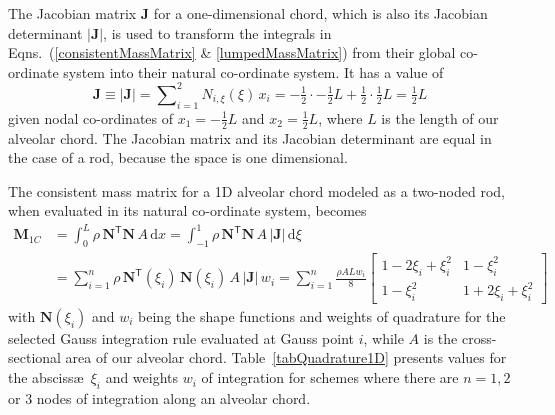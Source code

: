 The Jacobian matrix $\mathbf{J}$ for a one-dimensional chord, which is also its Jacobian determinant $| \mathbf{J} |$, is used to transform the integrals in Eqns.~(\ref{consistentMassMatrix} \& \ref{lumpedMassMatrix}) from their global co-ordinate system into their natural co-ordinate system.  It has a value of
\begin{equation}
     \mathbf{J} \equiv | \mathbf{J} | = \sum\nolimits_{i=1}^2 N_{i,\xi} (\xi) \, x_i = 
     -\tfrac{1}{2} \cdot -\tfrac{1}{2} L + \tfrac{1}{2} \cdot \tfrac{1}{2} L = 
     \tfrac{1}{2} L
     \label{detJac1D}
\end{equation}
given nodal co-ordinates of $x_1 = -\tfrac{1}{2} L$ and $x_2 = \tfrac{1}{2} L$, where $L$ is the length of our alveolar chord.  The Jacobian matrix and its Jacobian determinant are equal in the case of a rod, because the space is one dimensional. 

The consistent mass matrix for a 1D alveolar chord modeled as a two-noded rod, when evaluated in its natural co-ordinate system, becomes
\begin{equation}
    \begin{aligned}
    \mathbf{M}_{1C} & = \int_0^L \rho \, \mathbf{N}^{\mathsf{T}} \mathbf{N} \, A \, \mathrm{d} x  = \int_{-1}^{1} \rho \, \mathbf{N}^{\mathsf{T}} \mathbf{N}\, A \, | \mathbf{J} | \,  \mathrm{d} \xi \\
    & = \sum_{i=1}^n  \rho  \, \mathbf{N} ^{\mathsf{T}} (\xi_i) \, \mathbf{N}(\xi_i) \, A \, | \mathbf{J} | \, w_i = \sum_{i=1}^n \frac{\rho A L w_i}{8} \begin{bmatrix}
    1 - 2\xi_i + \xi_i^2 & 1 - \xi_i^2 \\
    1 - \xi_i^2 & 1 + 2 \xi_i + \xi_i^2
    \end{bmatrix}
    \end{aligned}
    \label{ConsMassMatrix1DA}
\end{equation}
with $\textbf{N} (\xi_i)$ and $w_i$ being the shape functions and weights of quadrature for the selected Gauss integration rule evaluated at Gauss point $i$, while $A$ is the cross-sectional area of our alveolar chord. Table~\ref{tabQuadrature1D} presents values for the absciss\ae\ $\xi_i$ and weights $w_i$ of integration for schemes where there are $n = 1, 2$ or $3$ nodes of integration along an alveolar chord.  

